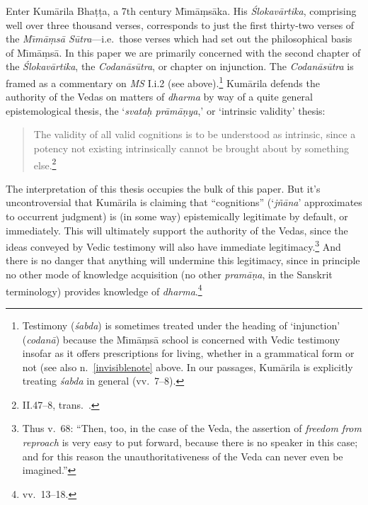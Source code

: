 ﻿\documentclass[11pt]{amsart}
\begin{document}
Enter Kum\=arila Bha\d t\d ta, a 7th century M\={\i}m\=a\d ms\=aka. His \emph{\small\'S\normalsize lokav\=artika}, comprising well over three thousand verses, corresponds to just the first thirty-two verses of the \emph{M\={\i}m\=a\d ms\=a S\=utra}---i.e.~those verses which had set out the philosophical basis of M\={\i}m\=a\d ms\=a.
In this paper we are primarily concerned with the second chapter of the \emph{\small\'S\normalsize lokav\=artika}, the \emph{Codan\=as\=utra}, or chapter on injunction. The \emph{Codan\=as\=utra} is framed as a commentary on \emph{MS} I.i.2 (see above).\footnote{Testimony (\emph{\'sabda}) is sometimes treated under the heading of `injunction' (\emph{codan\=a}) because the M\={\i}m\=a\d ms\=a school is concerned with Vedic testimony insofar as it offers prescriptions for living, whether in a grammatical form or not (see also n.~\ref{invisiblenote} above. In our passages, Kum\=arila is explicitly treating \emph{\'sabda} in general (vv.~7--8).} Kum\=arila defends the authority of the Vedas on matters of \emph{dharma} by way of a quite general epistemological thesis, the `\emph{svata\d h pr\=am\=a\d nya},' or `intrinsic validity' thesis:\small \begin{quote}The validity of all valid cognitions is to be understood as intrinsic, since a potency not existing intrinsically cannot be brought about by something else.\footnote{II.47--8, trans.~\citet[p.~207]{taber1992dkb}.}\end{quote} \normalsize The interpretation of this thesis occupies the bulk of this paper. But it's uncontroversial that Kum\=arila is claiming that ``cognitions'' (`\emph{j\~n\=ana}' approximates to occurrent judgment) is (in some way) epistemically legitimate by default, or immediately. This will ultimately support the authority of the Vedas, since the ideas conveyed by Vedic testimony will also have immediate legitimacy.\footnote{Thus v.~68: ``Then, too, in the case of the Veda, the assertion of \emph{freedom from reproach} is very easy to put forward, because there is no speaker in this case; and for this reason the unauthoritativeness of the Veda can never even be imagined.''} And there is no danger that anything will undermine this legitimacy, since in principle no other mode of knowledge acquisition (no other \emph{pram\=a\d na}, in the Sanskrit terminology) provides knowledge of \emph{dharma}.\footnote{vv.~13--18.}

\end{document}
